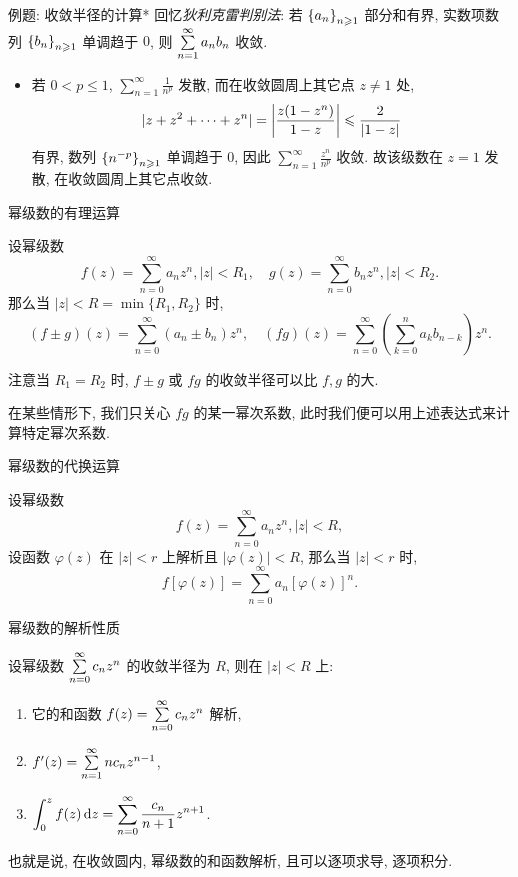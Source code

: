 \begin{frame}{例题: 收敛半径的计算*}
\onslide<+->
回忆\emph{狄利克雷判别法}: 若 ${\left\{a_n\right\}}_{n\geqslant 1}$ 部分和有界, 实数项数列 ${\left\{b_n\right\}}_{n\geqslant 1}$ 单调趋于 $0$, 则 $\sum\limits_{n=1}^\infty a_nb_n$ 收敛.

\begin{solutionc}
\begin{itemize}
\item 若 $0<p\le1$, $\displaystyle\sum_{n=1}^\infty\frac1{n^p}$ 发散, 
\onslide<+->
而在收敛圆周上其它点 $z\neq1$ 处,
\[|z+z^2+\cdots+z^n|=\left|\frac{z(1-z^n)}{1-z}\right|
\leqslant\frac{2}{|1-z|}\]
有界, 数列 ${\left\{n^{-p}\right\}}_{n\geqslant 1}$ 单调趋于 $0$,
\onslide<+->
因此 $\displaystyle\sum_{n=1}^\infty\frac{z^n}{n^p}$ 收敛.
\onslide<+->
故该级数在 $z=1$ 发散, 在收敛圆周上其它点收敛.
\end{itemize}
\end{solutionc}
\end{frame}


\begin{frame}{幂级数的有理运算}
\begin{theorem}
设幂级数
\[f(z)=\sum_{n=0}^\infty a_nz^n,|z|<R_1,\quad
g(z)=\sum_{n=0}^\infty b_nz^n,|z|<R_2.\]
\onslide<+->
那么当 $|z|<R=\min\{R_1,R_2\}$ 时,
\[(f\pm g)(z)=\sum_{n=0}^\infty (a_n\pm b_n)z^n,\quad
(fg)(z)=\sum_{n=0}^\infty\left(\sum_{k=0}^na_kb_{n-k}\right)z^n.\]
\end{theorem}
\onslide<+->
注意当 $R_1=R_2$ 时, $f\pm g$ 或 $fg$ 的收敛半径可以比 $f,g$ 的大.

\onslide<+->
在某些情形下, 我们只关心 $fg$ 的某一幂次系数,
\onslide<+->
此时我们便可以用上述表达式来计算特定幂次系数.
\end{frame}


\begin{frame}{幂级数的代换运算}
\begin{theorem}
设幂级数
\[f(z)=\sum_{n=0}^\infty a_nz^n,|z|<R,\]
设函数 $\varphi(z)$ 在 $|z|<r$ 上解析且 $|\varphi(z)|<R$, 
\onslide<+->
那么当 $|z|<r$ 时,
\[f[\varphi(z)]=\sum_{n=0}^\infty a_n[\varphi(z)]^n.\]
\end{theorem}
\end{frame}


\begin{frame}{幂级数的解析性质}
\begin{theorem}
设幂级数 $\sum\limits_{n=0}^\infty c_nz^n$ 的收敛半径为 $R$, 则在 $|z|<R$ 上:
\begin{enumerate}
\item 它的和函数 $f(z)=\sum\limits_{n=0}^\infty c_nz^n$ 解析,
\item $f'(z)=\sum\limits_{n=1}^\infty nc_nz^{n-1}$,
\item $\displaystyle\int_0^zf(z)\,\mathrm{d} z=\sum_{n=0}^\infty \frac{c_n}{n+1}z^{n+1}$.
\end{enumerate}
\end{theorem}
\onslide<+->
也就是说, \alert{在收敛圆内, 幂级数的和函数解析, 且可以逐项求导, 逐项积分}.
\end{frame}


